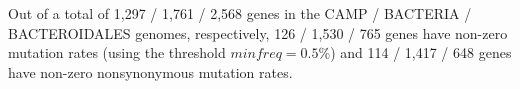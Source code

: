Out of a total of 1,297 / 1,761 / 2,568 genes in the CAMP / BACTERIA / BACTEROIDALES genomes, respectively, 126 / 1,530 / 765 genes have non-zero mutation rates (using the threshold $minfreq=0.5\%$) and 114 / 1,417 / 648 genes have non-zero nonsynonymous mutation rates.
